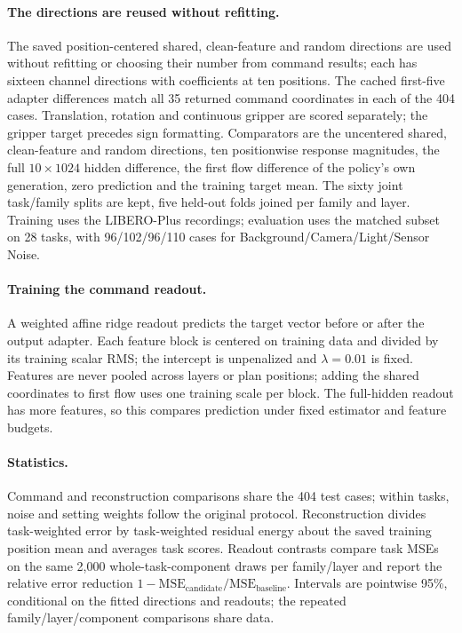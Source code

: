 \paragraph{The directions are reused without refitting.}
The saved position-centered shared, clean-feature and random directions are used without refitting or choosing their number from command results; each has sixteen channel directions with coefficients at ten positions. The cached first-five adapter differences match all 35 returned command coordinates in each of the 404 cases. Translation, rotation and continuous gripper are scored separately; the gripper target precedes sign formatting. Comparators are the uncentered shared, clean-feature and random directions, ten positionwise response magnitudes, the full $10\times1024$ hidden difference, the first flow difference of the policy's own generation, zero prediction and the training target mean. The sixty joint task/family splits are kept, five held-out folds joined per family and layer. Training uses the LIBERO-Plus recordings; evaluation uses the matched subset on 28 tasks, with 96/102/96/110 cases for Background/Camera/Light/Sensor Noise.

\paragraph{Training the command readout.}
A weighted affine ridge readout predicts the target vector before or after the output adapter. Each feature block is centered on training data and divided by its training scalar RMS; the intercept is unpenalized and $\lambda=0.01$ is fixed. Features are never pooled across layers or plan positions; adding the shared coordinates to first flow uses one training scale per block. The full-hidden readout has more features, so this compares prediction under fixed estimator and feature budgets.

\paragraph{Statistics.}
Command and reconstruction comparisons share the 404 test cases; within tasks, noise and setting weights follow the original protocol. Reconstruction divides task-weighted error by task-weighted residual energy about the saved training position mean and averages task scores. Readout contrasts compare task MSEs on the same 2,000 whole-task-component draws per family/layer and report the relative error reduction $1-\mathrm{MSE}_{\mathrm{candidate}}/\mathrm{MSE}_{\mathrm{baseline}}$. Intervals are pointwise 95\%, conditional on the fitted directions and readouts; the repeated family/layer/component comparisons share data.

